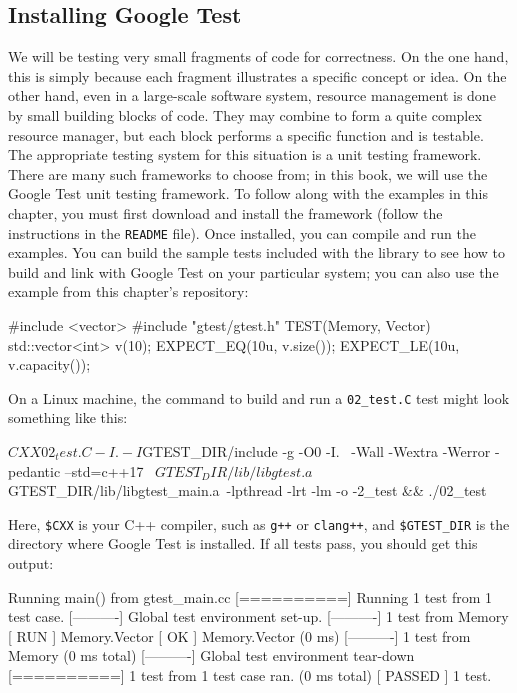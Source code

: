 \subsection{Installing Google Test}

We will be testing very small fragments of code for correctness. On the one hand, this is simply because each fragment illustrates a specific concept or idea. On the other hand, even in a large-scale software system, resource management is done by small building blocks of code. They may combine to form a quite complex resource manager, but each block performs a specific function and is testable. The appropriate testing system for this situation is a unit testing framework. There are many such frameworks to choose from; in this book, we will use the Google Test unit testing framework. To follow along with the examples in this chapter, you must first download and install the framework (follow the instructions in the \texttt{README} file). Once installed, you can compile and run the examples. You can build the sample tests included with the library to see how to build and link with Google Test on your particular system; you can also use the example from this chapter's repository:

\begin{code}
#include <vector>
#include "gtest/gtest.h"
TEST(Memory, Vector) {
  std::vector<int> v(10);
  EXPECT_EQ(10u, v.size());
  EXPECT_LE(10u, v.capacity());
}
\end{code}

On a Linux machine, the command to build and run a \texttt{02\_test.C} test might look something like this:

\begin{code}
$CXX 02_test.C -I. -I$GTEST_DIR/include -g -O0 -I. \
  -Wall -Wextra -Werror -pedantic --std=c++17 \
  $GTEST_DIR/lib/libgtest.a $GTEST_DIR/lib/libgtest_main.a\
  -lpthread -lrt -lm -o -2_test && ./02_test
\end{code}

Here, \texttt{\$CXX} is your C++ compiler, such as \texttt{g++} or \texttt{clang++}, and \texttt{\$GTEST\_DIR} is the directory where Google Test is installed. If all tests pass, you should get this output:

\begin{code}
Running main() from gtest_main.cc
[==========] Running 1 test from 1 test case.
[----------] Global test environment set-up.
[----------] 1 test from Memory
[ RUN      ] Memory.Vector
[       OK ] Memory.Vector (0 ms)
[----------] 1 test from Memory (0 ms total)
[----------] Global test environment tear-down
[==========] 1 test from 1 test case ran. (0 ms total)
[  PASSED  ] 1 test.
\end{code}

